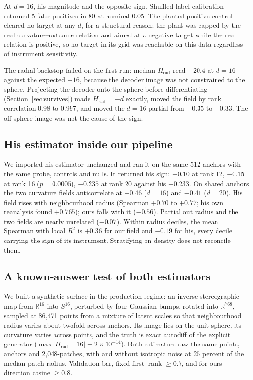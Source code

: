 \documentclass[11pt,a4paper]{article}
\newcommand{\Hrad}{H_{\mathrm{rad}}}
\begin{document}
At $d = 16$, his magnitude and the opposite sign. Shuffled-label calibration returned 5 false positives in 80 at nominal 0.05. The planted positive control cleared no target at any $d$, for a structural reason: the plant was capped by the real curvature--outcome relation and aimed at a negative target while the real relation is positive, so no target in its grid was reachable on this data regardless of instrument sensitivity.

The radial backstop failed on the first run: median $\Hrad$ read $-20.4$ at $d = 16$ against the expected $-16$, because the decoder image was not constrained to the sphere. Projecting the decoder onto the sphere before differentiating (Section~\ref{sec:survives}) made $\Hrad = -d$ exactly, moved the field by rank correlation 0.98 to 0.997, and moved the $d = 16$ partial from $+0.35$ to $+0.33$. The off-sphere image was not the cause of the sign.

\subsection{His estimator inside our pipeline}

We imported his estimator unchanged and ran it on the same 512 anchors with the same probe, controls and nulls. It returned his sign: $-0.10$ at rank 12, $-0.15$ at rank 16 ($p = 0.0005$), $-0.235$ at rank 20 against his $-0.233$. On shared anchors the two curvature fields anticorrelate at $-0.46$ ($d = 16$) and $-0.41$ ($d = 20$). His field rises with neighbourhood radius (Spearman $+0.70$ to $+0.77$; his own reanalysis found $+0.765$); ours falls with it ($-0.56$). Partial out radius and the two fields are nearly unrelated ($-0.07$). Within radius deciles, the mean Spearman with local $R^2$ is $+0.36$ for our field and $-0.19$ for his, every decile carrying the sign of its instrument. Stratifying on density does not reconcile them.

\subsection{A known-answer test of both estimators}

We built a synthetic surface in the production regime: an inverse-stereographic map from $\mathbb{R}^{16}$ into $S^{16}$, perturbed by four Gaussian bumps, rotated into $\mathbb{R}^{768}$, sampled at 86{,}471 points from a mixture of latent scales so that neighbourhood radius varies about twofold across anchors. Its image lies on the unit sphere, its curvature varies across points, and the truth is exact autodiff of the explicit generator ($\max\lvert \Hrad + 16 \rvert = 2\times10^{-14}$). Both estimators saw the same points, anchors and 2{,}048-patches, with and without isotropic noise at 25 percent of the median patch radius. Validation bar, fixed first: rank $\geq 0.7$, and for ours direction cosine $\geq 0.8$.
\end{document}
